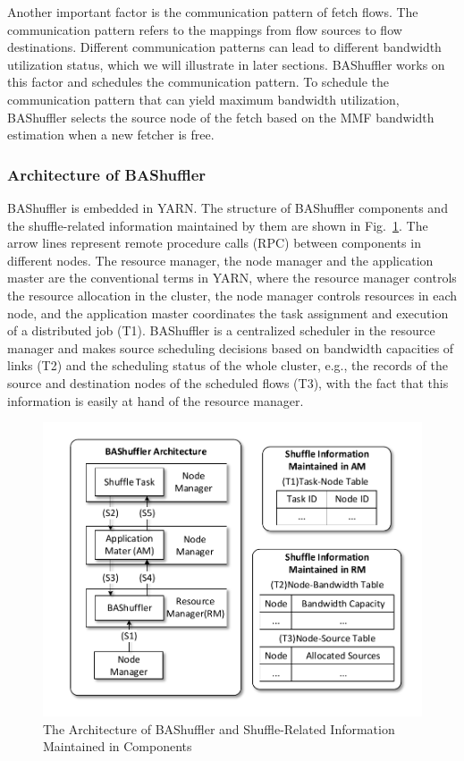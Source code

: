 \documentclass[10pt,journal,compsoc]{IEEEtran}
\begin{document}
Another important factor is the communication pattern of fetch
flows. 
The communication pattern refers to the mappings from flow sources to flow destinations.
Different communication patterns can lead to different bandwidth utilization status, which we will illustrate in later sections.
BAShuffler works on this factor and schedules the communication pattern.
To schedule the communication pattern that can yield maximum bandwidth
utilization, BAShuffler selects the source node of the fetch based on the MMF bandwidth estimation
when a new fetcher is free.


\subsubsection{Architecture of BAShuffler}
BAShuffler is embedded in YARN. The structure of BAShuffler components and the shuffle-related information maintained by them are shown in Fig.~\ref{fig:bashuffler}. 
The arrow lines represent remote procedure calls (RPC)
between components in different nodes.
The resource manager, the node manager and the application master  are the conventional terms in YARN, 
where the resource manager controls the resource allocation in the cluster, 
the node manager controls resources in each node, 
and the application master coordinates the task assignment and execution of a distributed job (T1). 
BAShuffler is a centralized scheduler in the resource manager and makes source scheduling decisions based on 
bandwidth capacities of links (T2) and the scheduling status of the whole cluster, e.g., the records of the source and
destination nodes of the scheduled flows (T3), 
with the fact that this information is easily at hand of the resource manager.

\begin{figure}
\centering

\includegraphics[width=1\columnwidth]{figure1}

\caption{The Architecture of BAShuffler and Shuffle-Related Information Maintained in Components}
\label{fig:bashuffler}
\end{figure}
\end{document}
